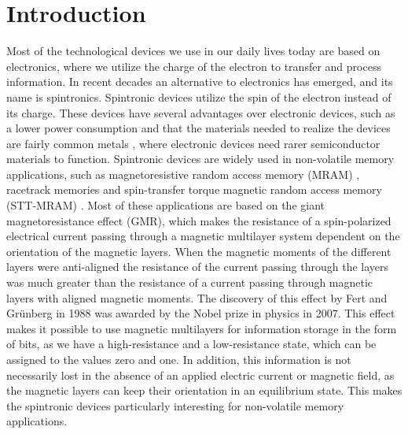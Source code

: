 \chapter{Introduction}
Most of the technological devices we use in our daily lives today are based on electronics, where we utilize the charge of the electron to transfer and process information. In recent decades an alternative to electronics has emerged, and its name is spintronics. Spintronic devices utilize the spin of the electron instead of its charge. These devices have several advantages over electronic devices, such as a lower power consumption and that the materials needed to realize the devices are fairly common metals \cite{Okamoto2014}, where electronic devices need rarer semiconductor materials to function. Spintronic devices are widely used in non-volatile memory applications, such as magnetoresistive random access memory (MRAM) \cite{Akerman2005,Katine2008}, racetrack memories \cite{Parkin2008} and spin-transfer torque magnetic random access memory (STT-MRAM) \cite{Kent2015}. Most of these applications are based on the giant magnetoresistance effect (GMR), which makes the resistance of a spin-polarized electrical current passing through a magnetic multilayer system dependent on the orientation of the magnetic layers. When the magnetic moments of the different layers were anti-aligned the resistance of the current passing through the layers was much greater than the resistance of a current passing through magnetic layers with aligned magnetic moments. The discovery of this effect by Fert \cite{Fert1988} and Gr\"{u}nberg \cite{Grunberg1989} in 1988 was awarded by the Nobel prize in physics in 2007. This effect makes it possible to use magnetic multilayers for information storage in the form of bits, as we have a high-resistance and a low-resistance state, which can be assigned to the values zero and one. In addition, this information is not necessarily lost in the absence of an applied electric current or magnetic field, as the magnetic layers can keep their orientation in an equilibrium state. This makes the spintronic devices particularly interesting for non-volatile memory applications.

